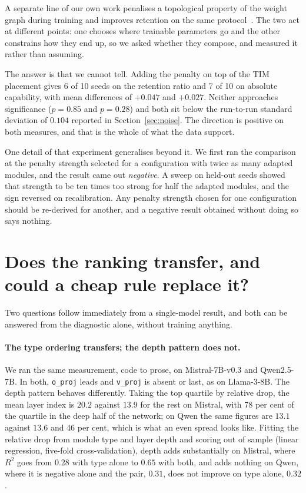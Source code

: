 \documentclass[11pt]{article}
\begin{document}
A separate line of our own work penalises a topological property of the weight
graph during training and improves retention on the same
protocol~\cite{acedo2026omegas}. The two act at different points: one chooses
where trainable parameters go and the other constrains how they end up, so we
asked whether they compose, and measured it rather than assuming.

The answer is that we cannot tell. Adding the penalty on top of the TIM placement gives 6 of 10 seeds on the retention ratio and 7 of 10 on absolute
capability, with mean differences of $+0.047$ and $+0.027$. Neither approaches
significance ($p = 0.85$ and $p = 0.28$) and both sit below the run-to-run
standard deviation of $0.104$ reported in Section~\ref{sec:noise}. The direction
is positive on both measures, and that is the whole of what the data support.

One detail of that experiment generalises beyond it. We first ran the comparison
at the penalty strength selected for a configuration with twice as many adapted
modules, and the result came out \emph{negative}. A sweep on held-out seeds
showed that strength to be ten times too strong for half the adapted modules,
and the sign reversed on recalibration. Any penalty strength chosen for one
configuration should be re-derived for another, and a negative result obtained
without doing so says nothing.

\section{Does the ranking transfer, and could a cheap rule replace it?}

Two questions follow immediately from a single-model result, and both can be
answered from the diagnostic alone, without training anything.

\paragraph{The type ordering transfers; the depth pattern does not.}
We ran the same measurement, code to prose, on Mistral-7B-v0.3 and
Qwen2.5-7B. In both, \texttt{o\_proj} leads and \texttt{v\_proj} is absent or
last, as on Llama-3-8B. The depth pattern behaves differently. Taking the top
quartile by relative drop, the mean layer index is $20.2$ against $13.9$ for the
rest on Mistral, with 78 per cent of the quartile in the deep half of the
network; on Qwen the same figures are $13.1$ against $13.6$ and 46 per cent,
which is what an even spread looks like. Fitting the relative drop from module
type and layer depth and scoring out of sample (linear regression, five-fold
cross-validation), depth adds substantially on Mistral, where $R^2$ goes from
$0.28$ with type alone to $0.65$ with both, and adds nothing on Qwen, where it
is negative alone and the pair, $0.31$, does not improve on type alone, $0.32$.
\end{document}
